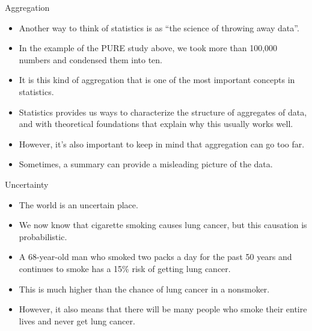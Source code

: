 \documentclass[handout]{beamer}
\begin{document}
\begin{frame}{Aggregation}

\scriptsize{
\begin{itemize}
\item Another way to think of statistics is as ``the science of throwing away data''.
\item In the example of the PURE study above, we took more than 100,000 numbers and condensed them into ten. 
\item It is this kind of aggregation that is one of the most important concepts in statistics. 
\item Statistics provides us ways to characterize the structure of aggregates of data, and with theoretical foundations that explain why this usually works well.
\item However, it’s also important to keep in mind that aggregation can go too far.
\item Sometimes, a summary can provide a misleading picture of the data.
\end{itemize}

}
 
\end{frame}


\begin{frame}{Uncertainty}

\scriptsize{
\begin{itemize}
\item The world is an uncertain place.
\item We now know that cigarette smoking causes lung cancer, but this causation is probabilistic.
\item A 68-year-old man who smoked two packs a day for the past 50 years and continues to smoke has a 15\% risk of getting lung cancer.
\item This is much higher than the chance of lung cancer in a nonsmoker. 
\item However, it also means that there will be many people who smoke their entire lives and never get lung cancer. 
\end{itemize}

}
 
\end{frame}
\end{document}
